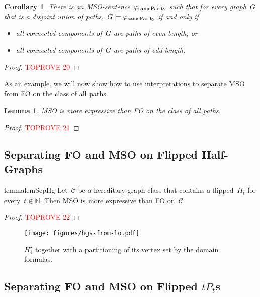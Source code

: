 \documentclass[11pt]{article}      \usepackage[margin=1in]{geometry}  \usepackage{microtype}
\newtheorem{corollary}[theorem]{Corollary}
\newtheorem{lemma}[theorem]{Lemma}
\theoremstyle{definition}
\newcommand{\N}[0]{\mathrm{\mathbb{N}}}
\newcommand{\CC}{\mathcal{C}}
\begin{document}
\begin{corollary}\label{lem:same-parity}
    There is an MSO-sentence~$\varphi_{\mathrm{sameParity}}$ such that for every graph~$G$ that is a disjoint union of paths,~$G \models \varphi_{\mathrm{sameParity}}$ if and only if
    \begin{itemize}
        \item all connected components of~$G$ are paths of even length, or 
        \item all connected components of~$G$ are paths of odd length.
    \end{itemize}
\end{corollary}
\begin{proof}\textcolor{red}{TOPROVE 20}\end{proof}

As an example, we will now show how to use interpretations to separate MSO from FO on the class of all paths.

\begin{lemma}\label{lem:expressiveness-paths}
    MSO is more expressive than FO on the class of all paths.
\end{lemma}
\begin{proof}\textcolor{red}{TOPROVE 21}\end{proof}
 
\subsection{Separating FO and MSO on Flipped Half-Graphs}

\begin{restatable}{lemma}{lemSepHg}
    \label{lem:sep-hg}
    Let~$\CC$ be a hereditary graph class that contains a flipped~$H_t$ for every~$t\in\N$.
    Then MSO is more expressive than FO on~$\CC$.
\end{restatable}

\begin{proof}\textcolor{red}{TOPROVE 22}\end{proof}


\begin{figure}[htbp]
    \centering
    \texttt{[image: figures/hgs-from-lo.pdf]}
    \caption{$H^\star_4$ together with a partitioning of its vertex set by the domain formulas.}
    \label{fig:hgs-from-lo}
\end{figure}
 
\subsection{Separating FO and MSO on Flipped \texorpdfstring{$tP_t$}{tPt}s}
\end{document}
